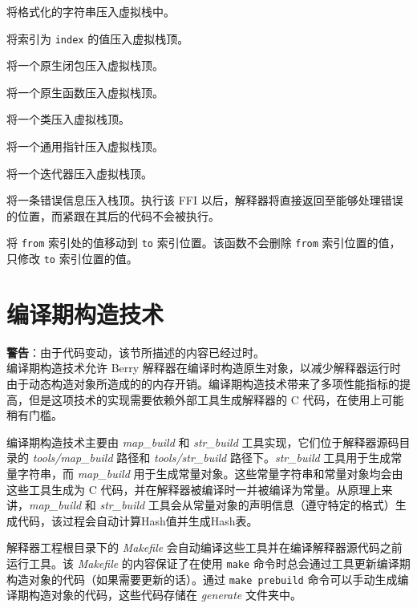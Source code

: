 将格式化的字符串压入虚拟栈中。


将索引为 \texttt{index} 的值压入虚拟栈顶。


将一个原生闭包压入虚拟栈顶。


将一个原生函数压入虚拟栈顶。


将一个类压入虚拟栈顶。


将一个通用指针压入虚拟栈顶。


将一个迭代器压入虚拟栈顶。


将一条错误信息压入栈顶。执行该 FFI 以后，解释器将直接返回至能够处理错误的位置，而紧跟在其后的代码不会被执行。


将 \texttt{from} 索引处的值移动到 \texttt{to} 索引位置。该函数不会删除 \texttt{from} 索引位置的值，只修改 \texttt{to} 索引位置的值。

\section{编译期构造技术} \label{section::precompiled_build}

\textbf{警告}：由于代码变动，该节所描述的内容已经过时。\\

编译期构造技术允许 Berry 解释器在编译时构造原生对象，以减少解释器运行时由于动态构造对象所造成的的内存开销。编译期构造技术带来了多项性能指标的提高，但是这项技术的实现需要依赖外部工具生成解释器的 C 代码，在使用上可能稍有门槛。

编译期构造技术主要由 \textsl{map\_build} 和 \textsl{str\_build} 工具实现，它们位于解释器源码目录的 \textsl{tools/map\_build} 路径和 \textsl{tools/str\_build} 路径下。\textsl{str\_build} 工具用于生成常量字符串，而 \textsl{map\_build} 用于生成常量对象。这些常量字符串和常量对象均会由这些工具生成为 C 代码，并在解释器被编译时一并被编译为常量。从原理上来讲，\textsl{map\_build} 和 \textsl{str\_build} 工具会从常量对象的声明信息（遵守特定的格式）生成代码，该过程会自动计算Hash值并生成Hash表。

解释器工程根目录下的 \textsl{Makefile} 会自动编译这些工具并在编译解释器源代码之前运行工具。该 \textsl{Makefile} 的内容保证了在使用 \texttt{make} 命令时总会通过工具更新编译期构造对象的代码（如果需要更新的话）。通过 \texttt{make prebuild} 命令可以手动生成编译期构造对象的代码，这些代码存储在 \textsl{generate} 文件夹中。

